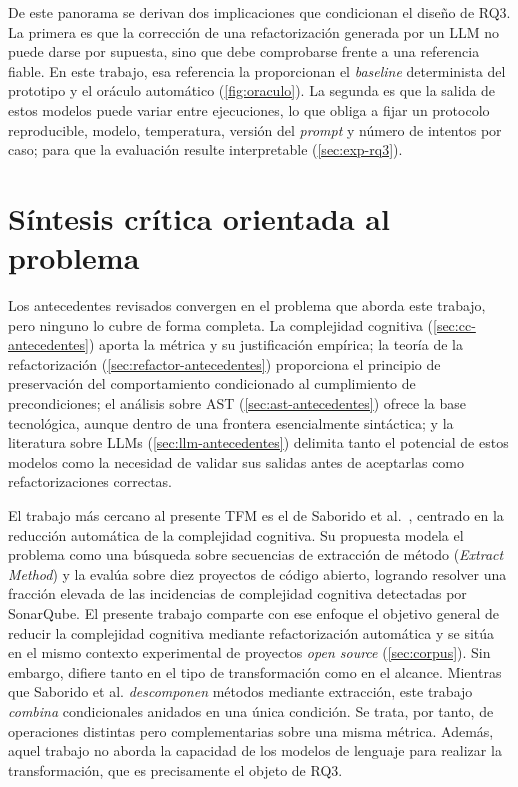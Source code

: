 De este panorama se derivan dos implicaciones que condicionan el diseño de
RQ3. La primera es que la corrección de una refactorización generada por un
LLM no puede darse por supuesta, sino que debe comprobarse frente a una
referencia fiable. En este trabajo, esa referencia la proporcionan el
\emph{baseline} determinista del prototipo y el oráculo automático
(\autoref{fig:oraculo}). La segunda es que la salida de estos modelos puede variar entre ejecuciones, lo que obliga a fijar un protocolo reproducible, modelo, temperatura, versión del \emph{prompt} y número de intentos por caso; para que la evaluación resulte interpretable
(\autoref{sec:exp-rq3}).

\section{Síntesis crítica orientada al problema}
\label{sec:sintesis-antecedentes}

Los antecedentes revisados convergen en el problema que aborda este trabajo,
pero ninguno lo cubre de forma completa. La complejidad cognitiva
(\autoref{sec:cc-antecedentes}) aporta la métrica y su justificación
empírica; la teoría de la refactorización
(\autoref{sec:refactor-antecedentes}) proporciona el principio de
preservación del comportamiento condicionado al cumplimiento de
precondiciones; el análisis sobre AST
(\autoref{sec:ast-antecedentes}) ofrece la base tecnológica, aunque dentro
de una frontera esencialmente sintáctica; y la literatura sobre LLMs
(\autoref{sec:llm-antecedentes}) delimita tanto el potencial de estos
modelos como la necesidad de validar sus salidas antes de aceptarlas como
refactorizaciones correctas.

El trabajo más cercano al presente TFM es el de Saborido et
al.~\cite{10.1109/ACCESS.2022.3144743}, centrado en la reducción automática
de la complejidad cognitiva. Su propuesta modela el problema como una
búsqueda sobre secuencias de extracción de método (\emph{Extract Method}) y
la evalúa sobre diez proyectos de código abierto, logrando resolver una
fracción elevada de las incidencias de complejidad cognitiva detectadas por
SonarQube. El presente trabajo comparte con ese enfoque el objetivo general
de reducir la complejidad cognitiva mediante refactorización automática y se
sitúa en el mismo contexto experimental de proyectos \emph{open source}
(\autoref{sec:corpus}). Sin embargo, difiere tanto en el tipo de
transformación como en el alcance. Mientras que Saborido et al.
\emph{descomponen} métodos mediante extracción, este trabajo
\emph{combina} condicionales anidados en una única condición. Se trata, por
tanto, de operaciones distintas pero complementarias sobre una misma
métrica. Además, aquel trabajo no aborda la capacidad de los modelos de
lenguaje para realizar la transformación, que es precisamente el objeto de
RQ3.

